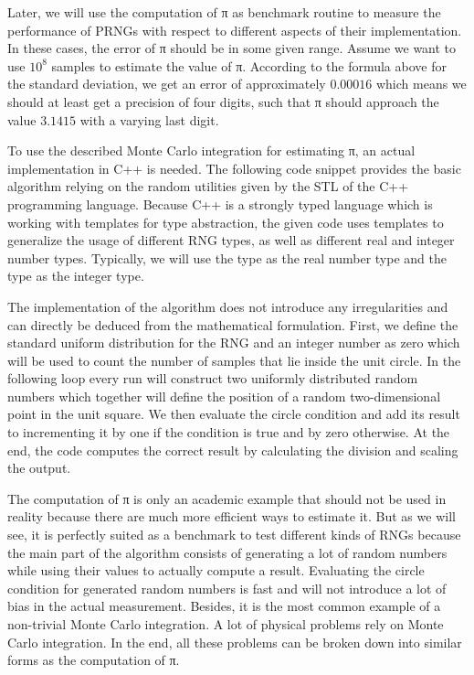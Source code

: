 \documentclass{stdlocal}
\begin{document}
    Later, we will use the computation of π as benchmark routine to measure the performance of PRNGs with respect to different aspects of their implementation.
    In these cases, the error of π should be in some given range.
    Assume we want to use $10^8$ samples to estimate the value of π.
    According to the formula above for the standard deviation, we get an error of approximately $0.00016$ which means we should at least get a precision of four digits, such that π should approach the value $3.1415$ with a varying last digit.

    To use the described Monte Carlo integration for estimating π, an actual implementation in C++ is needed.
    The following code snippet provides the basic algorithm relying on the random utilities given by the STL of the C++ programming language.
    Because C++ is a strongly typed language which is working with templates for type abstraction, the given code uses templates to generalize the usage of different RNG types, as well as different real and integer number types.
    Typically, we will use the  type as the real number type and the  type as the integer type.

    The implementation of the algorithm does not introduce any irregularities and can directly be deduced from the mathematical formulation.
    First, we define the standard uniform distribution for the RNG and an integer number  as zero which will be used to count the number of samples that lie inside the unit circle.
    In the following  loop every run will construct two uniformly distributed random numbers which together will define the position of a random two-dimensional point in the unit square.
    We then evaluate the circle condition and add its result to  incrementing it by one if the condition is true and by zero otherwise.
    At the end, the code computes the correct result by calculating the division and scaling the output.


    The computation of π is only an academic example that should not be used in reality because there are much more efficient ways to estimate it.
    But as we will see, it is perfectly suited as a benchmark to test different kinds of RNGs because the main part of the algorithm consists of generating a lot of random numbers while using their values to actually compute a result.
    Evaluating the circle condition for generated random numbers is fast and will not introduce a lot of bias in the actual measurement.
    Besides, it is the most common example of a non-trivial Monte Carlo integration.
    A lot of physical problems rely on Monte Carlo integration.
    In the end, all these problems can be broken down into similar forms as the computation of π.
    \autocite{mueller2012,landau2014,pharr2016}
\end{document}
